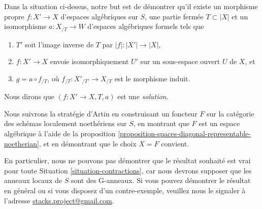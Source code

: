 \noindent
Dans la situation ci-dessus, notre but est de démontrer qu'il existe un
morphisme propre $f : X' \to X$ d'espaces algébriques sur $S$,
une partie fermée $T \subset |X|$ et un isomorphisme
$a : X_{/T} \to W$ d'espaces algébriques formels tels que
\begin{enumerate}
\item $T'$ soit l'image inverse de $T$ par $|f| : |X'| \to |X|$,
\item $f : X' \to X$ envoie isomorphiquement $U'$ sur
un sous-espace ouvert $U$ de $X$, et
\item $g = a \circ f_{/T}$, où $f_{/T} : X'_{/T'} \to X_{/T}$
est le morphisme induit.
\end{enumerate}
Nous dirons que $(f : X' \to X, T, a)$ est une {\it solution}.

\medskip\noindent
Nous suivrons la stratégie d'Artin en construisant un foncteur $F$ sur
la catégorie des schémas localement noethériens sur $S$, en montrant que $F$ est un
espace algébrique à l'aide de la
proposition \ref{proposition-spaces-diagonal-representable-noetherian},
et en démontrant que le choix $X = F$ convient.

\begin{remark}
\label{remark-G-rings}
En particulier, nous ne pouvons pas démontrer que le résultat souhaité est vrai pour
toute Situation \ref{situation-contractions}, car nous devrons
supposer que les anneaux locaux de $S$ sont des G-anneaux. Si vous pouvez démontrer le
résultat en général ou si vous disposez d'un contre-exemple, veuillez
nous le signaler à l'adresse
\href{mailto:stacks.project@gmail.com}{stacks.project@gmail.com}.
\end{remark}

